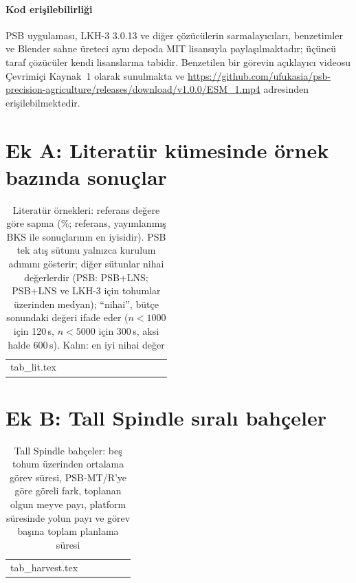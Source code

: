\documentclass[11pt,a4paper]{article}
\makeatletter
\newcommand{\rawinput}[1]{\@@input #1 }
\makeatother
\begin{document}
\paragraph{Kod erişilebilirliği} PSB uygulaması, LKH-3 3.0.13 ve diğer çözücülerin
sarmalayıcıları, benzetimler ve Blender sahne üreteci aynı depoda MIT lisansıyla
paylaşılmaktadır; üçüncü taraf çözücüler kendi lisanslarına tabidir. Benzetilen bir
görevin açıklayıcı videosu Çevrimiçi Kaynak~1 olarak sunulmakta ve
\url{https://github.com/ufukasia/psb-precision-agriculture/releases/download/v1.0.0/ESM_1.mp4}
adresinden erişilebilmektedir.

\appendix
\section{Ek A: Literatür kümesinde örnek bazında sonuçlar}\label{app:lit}
{\tiny
\setlength{\tabcolsep}{2.6pt}
\begin{longtable}{l*{11}{r}}
\caption{Literatür örnekleri: referans değere göre sapma (\%; referans, yayımlanmış
BKS ile \citet{hehaoxia2024} sonuçlarının en iyisidir). PSB tek atış sütunu yalnızca kurulum
adımını gösterir; diğer sütunlar nihai değerlerdir (PSB: PSB+LNS; PSB+LNS ve LKH-3 için
tohumlar üzerinden medyan); ``nihai'', bütçe sonundaki değeri ifade eder ($n<1000$ için 120\,s,
$n<5000$ için 300\,s, aksi halde 600\,s). Kalın: en iyi nihai değer}\label{tab:lit}\\
\rawinput{tab_lit.tex}
\end{longtable}}

\clearpage
\section{Ek B: Tall Spindle sıralı bahçeler}\label{app:rows}
{\scriptsize
\setlength{\tabcolsep}{4pt}
\begin{longtable}{lrrrrr}
\caption{Tall Spindle bahçeler: beş tohum üzerinden ortalama görev süresi, PSB-MT/R'ye
göre göreli fark, toplanan olgun meyve payı, platform süresinde yolun payı ve görev
başına toplam planlama süresi}\label{tab:rows}\\
\rawinput{tab_harvest.tex}
\end{longtable}}

\clearpage


\end{document}
